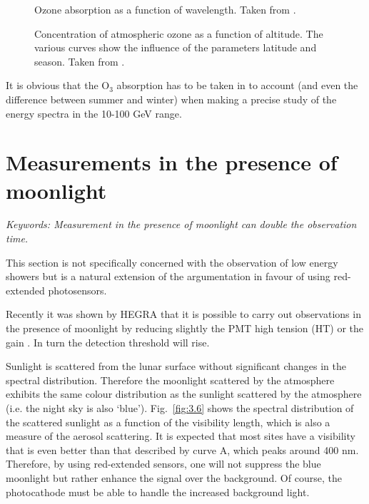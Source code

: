 \begin{figure}[htb]
\epsfxsize=13cm
\caption{Ozone absorption as a function of
 wavelength. Taken from \cite{driscoll:78}.}
\label{fig:3.4}
\end{figure}

\begin{figure}[htb]
\epsfxsize=13cm
\caption{Concentration of atmospheric ozone as a function of
altitude. The various curves show the influence of the parameters latitude
and season. Taken from \cite{driscoll:78}.}
\label{fig:3.5}
\end{figure}

It is obvious that the O$_3$ absorption has to be taken in to
account (and even the difference between summer and winter)
when making a precise study of the energy spectra 
in the 10-100 GeV range.

\section{Measurements in the presence of moonlight}

{\it Keywords: Measurement in the presence of moonlight can double the
observation time.}

This section is not specifically concerned with the observation
of low energy showers but is a 
natural extension of the argumentation in favour of using 
red-extended photosensors. 

Recently it was shown by HEGRA that it is possible 
to carry out observations in the 
presence of moonlight by reducing slightly the PMT high
tension (HT) 
or the gain \cite{raubenheimer:97}.
In turn the 
detection threshold will rise. 

Sunlight is scattered from the lunar surface without significant
changes in the spectral distribution. 
Therefore the  moonlight scattered by the atmosphere exhibits the 
same colour distribution as the 
sunlight scattered by the atmosphere (i.e. the night sky is also 
`blue'). Fig.~\ref{fig:3.6} shows the spectral 
distribution of the scattered sunlight as a function of the 
visibility length, which is also a 
measure of the aerosol scattering. It is expected that most
sites have a visibility that is even better than 
that described by curve A, which peaks around 400 nm. 
Therefore, by using red-extended 
sensors, one will not suppress the blue moonlight but
rather enhance the signal over the 
background. Of course, the photocathode must be able to
handle the increased background 
light. 

